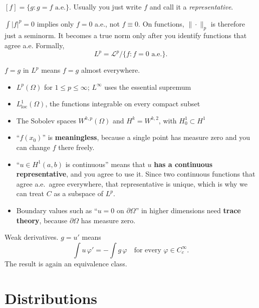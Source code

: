 \documentclass[11pt]{article}
\newcommand{\Lloc}{L^1_{\mathrm{loc}}}
\newcommand{\Cc}{C_c^\infty}
\begin{document}
\begin{description}[leftmargin=0pt]
  \item[What they are.] $[f]=\{g : g=f \text{ a.e.}\}$. Usually you just write
    $f$ and call it a \emph{representative}.
  \item[Why we need them.] $\int|f|^p=0$ implies only $f=0$ a.e., not
    $f\equiv 0$. On functions, $\|\cdot\|_p$ is therefore just a seminorm. It
    becomes a true norm only after you identify functions that agree a.e.
    Formally,
    \[
      L^p = \mathcal{L}^p \big/ \{f : f=0 \text{ a.e.}\}.
    \]
  \item[Equality.] $f=g$ in $L^p$ means $f=g$ almost everywhere.
  \item[Typical spaces.] \leavevmode
    \begin{itemize}
      \item $L^p(\Omega)$ for $1\le p\le\infty$; $L^\infty$ uses the essential
        supremum
      \item $\Lloc(\Omega)$, the functions integrable on every compact subset
      \item The Sobolev spaces $W^{k,p}(\Omega)$ and $H^k=W^{k,2}$, with
        $H^1_0\subset H^1$
    \end{itemize}
  \item[Language.] \leavevmode
    \begin{itemize}
      \item ``$f(x_0)$'' is \textbf{meaningless}, because a single point has
        measure zero and you can change $f$ there freely.
      \item ``$u\in H^1(a,b)$ is continuous'' means that $u$ \textbf{has a
        continuous representative}, and you agree to use it. Since two
        continuous functions that agree a.e.\ agree everywhere, that
        representative is unique, which is why we can treat $C$ as a subspace
        of $L^p$.
      \item Boundary values such as ``$u=0$ on $\partial\Omega$'' in higher
        dimensions need \textbf{trace theory}, because $\partial\Omega$ has
        measure zero.
    \end{itemize}
  \item[Derivatives.] Weak derivatives. $g=u'$ means
    \[
      \int u\,\varphi' = -\int g\,\varphi \quad\text{for every } \varphi\in\Cc.
    \]
    The result is again an equivalence class.
\end{description}

\section{Distributions}
\end{document}
